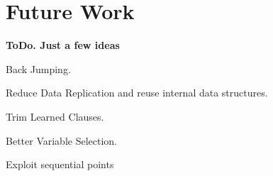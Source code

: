 \chapter{Future Work}
\label{chap:future}

\textbf{ToDo. Just a few ideas}

Back Jumping.

Reduce Data Replication and reuse internal data structures.

Trim Learned Clauses.

Better Variable Selection.

Exploit sequential points
